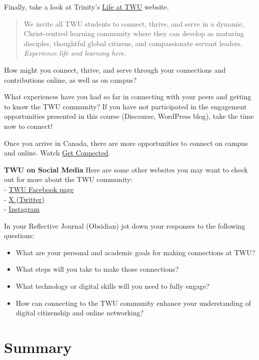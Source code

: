 \documentclass[
]{book}
\providecommand{\tightlist}{%
  \setlength{\itemsep}{0pt}\setlength{\parskip}{0pt}}
\theoremstyle{definition}
\theoremstyle{definition}
\theoremstyle{definition}
\theoremstyle{definition}
\theoremstyle{remark}
\begin{document}
\begin{reflect}
Finally, take a look at Trinity's \href{https://www.twu.ca/life-twu}{Life at TWU} website.

\begin{quote}
We invite all TWU students to connect, thrive, and serve in a dynamic, Christ-centred learning community where they can develop as maturing disciples, thoughtful global citizens, and compassionate servant leaders.
\emph{Experience life and learning here.}
\end{quote}

How might you connect, thrive, and serve through your connections and contributions online, as well as on campus?

What experiences have you had so far in connecting with your peers and getting to know the TWU community? If you have not participated in the engagement opportunities presented in this course (Discourse, WordPress blog), take the time now to connect!

Once you arrive in Canada, there are more opportunities to connect on campus and online. Watch \href{https://vimeo.com/584977176/f1938444cb}{Get Connected}.

\textbf{TWU on Social Media}
Here are some other websites you may want to check out for more about the TWU community:\\
- \href{facebook.com/trinitywestern}{TWU Facebook page}\\
- \href{twitter.com/trinitywestern}{X (Twitter)}\\
- \href{instagram.com/trinitywestern}{Instagram}

In your Reflective Journal (Obsidian) jot down your responses to the following questions:

\begin{itemize}
\tightlist
\item
  What are your personal and academic goals for making connections at TWU?\\
\item
  What steps will you take to make those connections?\\
\item
  What technology or digital skills will you need to fully engage?
\item
  How can connecting to the TWU community enhance your understanding of digital citizenship and online networking?
\end{itemize}
\end{reflect}

\hypertarget{summary-4}{%
\section*{Summary}\label{summary-4}}
\end{document}
